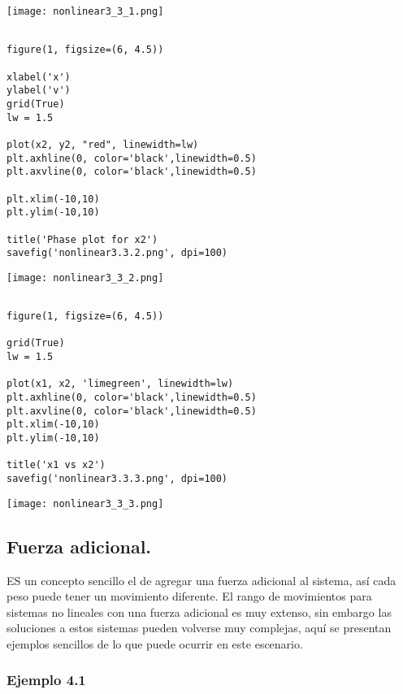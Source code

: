 \documentclass{article} %
\begin{document}
\begin{center}
	\texttt{[image: nonlinear3\_3\_1.png]}
\end{center}


\begin{verbatim} 

figure(1, figsize=(6, 4.5))

xlabel('x')
ylabel('v')
grid(True)
lw = 1.5

plot(x2, y2, "red", linewidth=lw)
plt.axhline(0, color='black',linewidth=0.5)
plt.axvline(0, color='black',linewidth=0.5)

plt.xlim(-10,10)
plt.ylim(-10,10)

title('Phase plot for x2')
savefig('nonlinear3.3.2.png', dpi=100)

\end{verbatim}


\begin{center}
	\texttt{[image: nonlinear3\_3\_2.png]}
\end{center}


\begin{verbatim} 

figure(1, figsize=(6, 4.5))

grid(True)
lw = 1.5

plot(x1, x2, 'limegreen', linewidth=lw)
plt.axhline(0, color='black',linewidth=0.5)
plt.axvline(0, color='black',linewidth=0.5)
plt.xlim(-10,10)
plt.ylim(-10,10)

title('x1 vs x2')
savefig('nonlinear3.3.3.png', dpi=100)

\end{verbatim}


\begin{center}
	\texttt{[image: nonlinear3\_3\_3.png]}
\end{center}


\subsection{Fuerza adicional.}

ES un concepto sencillo el de agregar una fuerza adicional al sistema, así cada peso puede tener un movimiento diferente. El rango de movimientos para sistemas no lineales con una fuerza adicional es muy extenso, sin embargo las soluciones a estos sistemas pueden volverse muy complejas, aquí se presentan ejemplos sencillos de lo que puede ocurrir en este escenario. 

\subsubsection{Ejemplo 4.1}
\end{document}
